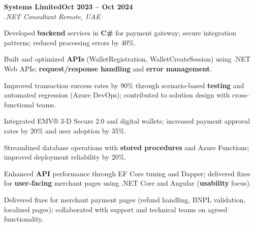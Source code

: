 \documentclass[letterpaper,10pt]{article}
\newcommand{\headingBf}[2]{
  \hspace{10pt}\textbf{#1}\hfill\textbf{#2}\\
}
\newcommand{\headingIt}[2]{
  \hspace{10pt}\textit{#1}\hfill\textit{#2}\\
}
\newenvironment{resume_list}{
  \vspace{-7pt}
  \begin{itemize}[itemsep=-2px, parsep=1pt, leftmargin=30pt]
}{
  \end{itemize}
}
\begin{document}
\headingBf{Systems Limited}{Oct 2023 -- Oct 2024}
\headingIt{.NET Consultant \hfill Remote, UAE}{}
\begin{resume_list}
    \item Developed \textbf{backend} services in \textbf{C\#} for payment gateway; secure integration patterns; reduced processing errors by 40\%.
    \item Built and optimized \textbf{APIs} (WalletRegistration, WalletCreateSession) using .NET Web APIs; \textbf{request/response handling} and \textbf{error management}.
    \item Improved transaction success rates by 90\% through scenario-based \textbf{testing} and automated regression (Azure DevOps); contributed to solution design with cross-functional teams.
    \item Integrated EMV® 3-D Secure 2.0 and digital wallets; increased payment approval rates by 20\% and user adoption by 35\%.
    \item Streamlined database operations with \textbf{stored procedures} and Azure Functions; improved deployment reliability by 20\%.
    \item Enhanced \textbf{API} performance through EF Core tuning and Dapper; delivered fixes for \textbf{user-facing} merchant pages using .NET Core and Angular (\textbf{usability} focus).
    \item Delivered fixes for merchant payment pages (refund handling, BNPL validation, localized pages); collaborated with support and technical teams on agreed functionality.
\end{resume_list}
\end{document}
